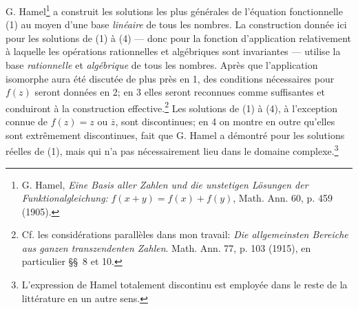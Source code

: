 G. Hamel\footnote{G. Hamel, \emph{Eine Basis aller Zahlen und die unstetigen Lösungen der Funktionalgleichung:} $f(x+y)=f(x)+f(y)$, Math. Ann. 60, p. 459 (1905).} a construit les solutions les plus générales de l'équation fonctionnelle (1) au moyen d'une base \emph{linéaire} de tous les nombres. La construction donnée ici pour les solutions de (1) à (4) --- donc pour la fonction d'application relativement à laquelle les opérations rationnelles et algébriques sont invariantes --- utilise la base \emph{rationnelle} et \emph{algébrique} de tous les nombres. Après que l'application isomorphe aura été discutée de plus près en 1, des conditions nécessaires pour $f(z)$ seront données en 2; en 3 elles seront reconnues comme suffisantes et conduiront à la construction effective.\footnote{Cf. les considérations parallèles dans mon travail: \emph{Die allgemeinsten Bereiche aus ganzen transzendenten Zahlen}. Math. Ann. 77, p. 103 (1915), en particulier \S\S\ 8 et 10.} Les solutions de (1) à (4), à l'exception connue de $f(z)=z$ ou $\overline z$, sont discontinues; en 4 on montre en outre qu'elles sont \og{}extrêmement discontinues\fg{}, fait que G. Hamel a démontré pour les solutions réelles de (1), mais qui n'a pas nécessairement lieu dans le domaine complexe.\footnote{L'expression de Hamel \og{}totalement discontinu\fg{} est employée dans le reste de la littérature en un autre sens.}

